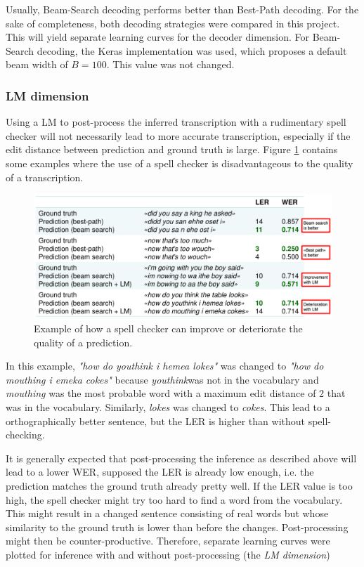 Usually, Beam-Search decoding performs better than Best-Path decoding. For the sake of completeness, both decoding strategies were compared in this project. This will yield separate learning curves for the decoder dimension. For Beam-Search decoding, the Keras implementation was used, which proposes a default beam width of $B=100$. This value was not changed. 

\subsubsection{\ac{LM} dimension}

Using a \ac{LM} to post-process the inferred transcription with a rudimentary spell checker will not necessarily lead to more accurate transcription, especially if the edit distance between prediction and ground truth is large. Figure \ref{lm_dimension_example} contains some examples where the use of a spell checker is disadvantageous to the quality of a transcription.

\begin{figure}[h!]
	\includegraphics[width=\linewidth]{./img/lm_dimension_example.png}
	\caption{Example of how a spell checker can improve or deteriorate the quality of a prediction.}
	\label{lm_dimension_example}
\end{figure}

In this example, \textit{"how do youthink i hemea lokes"} was changed to \textit{"how do mouthing i emeka cokes"} because \textit{youthink}was not in the vocabulary and \textit{mouthing} was the most probable word with a maximum edit distance of 2 that was in the vocabulary. Similarly, \textit{lokes} was changed to \textit{cokes}. This lead to a orthographically better sentence, but the \ac{LER} is higher than without spell-checking. 

It is generally expected that post-processing the inference as described above will lead to a lower \ac{WER}, supposed the \ac{LER} is already low enough, i.e. the prediction matches the ground truth already pretty well. If the \ac{LER} value is too high, the spell checker might try too hard to find a word from the vocabulary. This might result in a changed sentence consisting of real words but whose similarity to the ground truth is lower than before the changes. Post-processing might then be counter-productive. Therefore, separate learning curves were plotted for inference with and without post-processing (the \textit{\ac{LM} dimension})


